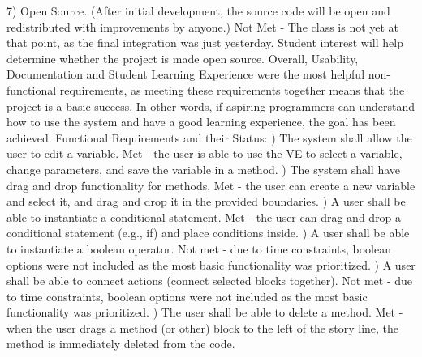\documentclass[a4paper]{article}
\begin{document}
7) Open Source. (After initial development, the source code will be open and redistributed with improvements by anyone.) Not Met - The class is not yet at that point, as the final integration was just yesterday. Student interest will help determine whether the project is made open source. \newline \newline 
Overall, Usability, Documentation and Student Learning Experience were the most helpful non-functional requirements, as meeting these requirements together means that the project is a basic success. In other words, if aspiring programmers can understand how to use the system and have a good learning experience, the goal has been achieved. \newline \newline
Functional Requirements and their Status: \newline {}) The system shall allow the user to edit a variable. Met - the user is able to use the VE to select a variable, change parameters, and save the variable in a method. \newline {}) The system shall have drag and drop functionality for methods. Met - the user can create a new variable and select it, and drag and drop it in the provided boundaries. \newline {}) A user shall be able to instantiate a conditional statement. Met - the user can drag and drop a conditional statement (e.g., if) and place conditions inside. \newline {}) A user shall be able to instantiate a boolean operator. Not met - due to time constraints, boolean options were not included as the most basic functionality was prioritized. \newline {}) A user shall be able to connect actions (connect selected blocks together). Not met - due to time constraints, boolean options were not included as the most basic functionality was prioritized. \newline {}) The user shall be able to delete a method. Met - when the user drags a method (or other) block to the left of the story line, the method is immediately deleted from the code. \newline \newline
\end{document}
